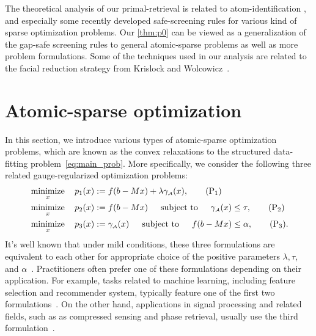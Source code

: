 The theoretical analysis of our primal-retrieval is related to atom-identification \cite{BurM88,hare2004identifying,hare2011identifying}, and especially some recently developed safe-screening rules \cite{Ghaoui12,wang2013lasso,liu2014safe,WangZLWY14,Raj2015ScreeningRF,BonnefoyERG15,XiangWR17,NdiayeFGS17,ZhangHLYCHW17,kuang2017screening,Atamtrk2020SafeSR,Bao20} for various kind of sparse optimization problems. Our \autoref{thm:p0} can be viewed as a generalization of the gap-safe screening rules to general atomic-sparse problems as well as more problem formulations. Some of the techniques used in our analysis are related to the facial reduction strategy from Krislock and Wolcowicz~\cite{krislock2010explicit}. 


\section{Atomic-sparse optimization}
\label{sec:probSetting}

In this section, we introduce various types of atomic-sparse optimization problems, which are known as the convex relaxations to the structured data-fitting problem~\eqref{eq:main_prob}. More specifically, 
we consider the following three related gauge-regularized optimization
problems:
\begin{align} 
  & \displaystyle\mathop{\hbox{\rm minimize}}_{x}\enspace\enspace p_1(x) := f(b - Mx) + \lambda\gamma_{\scriptscriptstyle\mathcal{A}}(x), \label{prob:primal1} \tag{P$_1$} \\
  & \displaystyle\mathop{\hbox{\rm minimize}}_{x}\enspace\enspace p_2(x) := f(b - Mx) \enspace\hbox{\quad subject to\quad}\enspace \gamma_{\scriptscriptstyle\mathcal{A}}(x) \leq \tau, \label{prob:primal2} \tag{P$_2$} \\
  & \displaystyle\mathop{\hbox{\rm minimize}}_{x}\enspace\enspace p_3(x) := \gamma_{\scriptscriptstyle\mathcal{A}}(x)  \enspace\hbox{\quad subject to\quad}\enspace f(b - Mx) \leq \alpha, \label{prob:primal3} \tag{P$_3$}. 
\end{align}
It's well known that under mild conditions, these three formulations are equivalent to each other for appropriate choice of the positive parameters $\lambda, \tau$, and $\alpha$~\cite{FrieTsen:2006}. Practitioners often prefer one of these formulations depending on their application. For example, tasks related to machine learning, including feature selection and recommender system, typically feature one of the first two formulations~\cite{tibshirani1996regression,yul06,Meinshausen06}.  On the other hand, applications in signal processing and related fields, such as as compressed sensing and phase retrieval, usually use the third formulation~\cite{berg2008probing,candes:2013}. 

